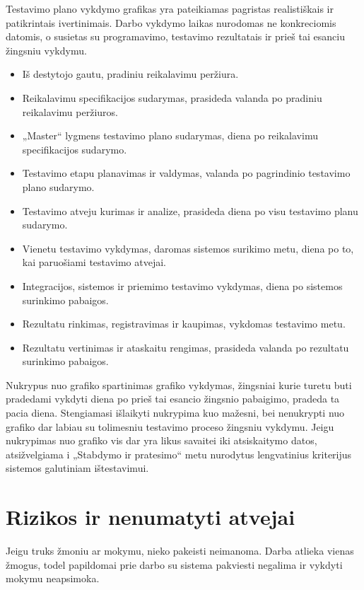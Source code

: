 \documentclass{VUMIFPSkursinis}
\begin{document}
Testavimo plano vykdymo grafikas yra pateikiamas pagristas realistiškais ir patikrintais ivertinimais.
Darbo vykdymo laikas nurodomas ne konkreciomis datomis, o susietas su programavimo, testavimo rezultatais ir prieš tai esanciu žingsniu vykdymu.

\begin{itemize}
	\item Iš destytojo gautu, pradiniu reikalavimu peržiura.
	\item Reikalavimu specifikacijos sudarymas, prasideda valanda po pradiniu reikalavimu peržiuros.
	\item „Master“ lygmens testavimo plano sudarymas, diena po reikalavimu specifikacijos sudarymo.
	\item Testavimo etapu planavimas ir valdymas, valanda po pagrindinio testavimo plano sudarymo.
	\item Testavimo atveju kurimas ir analize, prasideda diena po visu testavimo planu sudarymo.
	\item Vienetu testavimo vykdymas, daromas sistemos surikimo metu, diena po to, kai paruošiami testavimo atvejai.
	\item Integracijos, sistemos ir priemimo testavimo vykdymas, diena po sistemos surinkimo pabaigos.
	\item Rezultatu rinkimas, registravimas ir kaupimas, vykdomas testavimo metu.
	\item Rezultatu vertinimas ir ataskaitu rengimas, prasideda valanda po rezultatu surinkimo pabaigos.
\end{itemize}

Nukrypus nuo grafiko spartinimas grafiko vykdymas, žingsniai kurie turetu buti pradedami vykdyti diena po prieš tai esancio žingsnio pabaigimo, pradeda ta pacia diena. 
Stengiamasi išlaikyti nukrypima kuo mažesni, bei nenukrypti nuo grafiko dar labiau su tolimesniu testavimo proceso žingsniu vykdymu. 
Jeigu nukrypimas  nuo grafiko vis dar yra likus savaitei iki atsiskaitymo datos, atsižvelgiama i „Stabdymo ir pratesimo“ metu nurodytus lengvatinius kriterijus sistemos galutiniam ištestavimui.

\section{Rizikos ir nenumatyti atvejai}

Jeigu truks žmoniu ar mokymu, nieko pakeisti neimanoma. Darba atlieka vienas žmogus, todel papildomai prie darbo su sistema pakviesti negalima ir vykdyti mokymu neapsimoka. 
\end{document}
